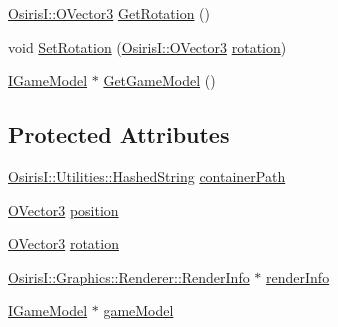 \begin{DoxyCompactItemize}
\item 
\hyperlink{struct_osiris_i_1_1_o_vector3}{Osiris\-I\-::\-O\-Vector3} \hyperlink{class_osiris_i_1_1_graphics_1_1_actors_1_1_i_actor_a3cf2d26df06c6a138e0305eff2e0f492}{Get\-Rotation} ()
\item 
void \hyperlink{class_osiris_i_1_1_graphics_1_1_actors_1_1_i_actor_af463112d067a438c342d2c9ae7500306}{Set\-Rotation} (\hyperlink{struct_osiris_i_1_1_o_vector3}{Osiris\-I\-::\-O\-Vector3} \hyperlink{class_osiris_i_1_1_graphics_1_1_actors_1_1_i_actor_aadbd536facb2686bdcb7d5c61c86dcd0}{rotation})
\item 
\hyperlink{class_osiris_i_1_1_graphics_1_1_actors_1_1_i_game_model}{I\-Game\-Model} $\ast$ \hyperlink{class_osiris_i_1_1_graphics_1_1_actors_1_1_i_actor_a474d10a3d3e71a93230510385b8cae01}{Get\-Game\-Model} ()
\end{DoxyCompactItemize}
\subsection*{Protected Attributes}
\begin{DoxyCompactItemize}
\item 
\hyperlink{class_osiris_i_1_1_utilities_1_1_hashed_string}{Osiris\-I\-::\-Utilities\-::\-Hashed\-String} \hyperlink{class_osiris_i_1_1_graphics_1_1_actors_1_1_i_actor_a71a1f44f10a60275425df720cfa84953}{container\-Path}
\item 
\hyperlink{struct_osiris_i_1_1_o_vector3}{O\-Vector3} \hyperlink{class_osiris_i_1_1_graphics_1_1_actors_1_1_i_actor_aee6ea81df284578ca63a186a03dd3bcc}{position}
\item 
\hyperlink{struct_osiris_i_1_1_o_vector3}{O\-Vector3} \hyperlink{class_osiris_i_1_1_graphics_1_1_actors_1_1_i_actor_aadbd536facb2686bdcb7d5c61c86dcd0}{rotation}
\item 
\hyperlink{struct_osiris_i_1_1_graphics_1_1_renderer_1_1_render_info}{Osiris\-I\-::\-Graphics\-::\-Renderer\-::\-Render\-Info} $\ast$ \hyperlink{class_osiris_i_1_1_graphics_1_1_actors_1_1_i_actor_a309233167da3c59ef681a8954c15bdf7}{render\-Info}
\item 
\hyperlink{class_osiris_i_1_1_graphics_1_1_actors_1_1_i_game_model}{I\-Game\-Model} $\ast$ \hyperlink{class_osiris_i_1_1_graphics_1_1_actors_1_1_i_actor_addc686085f0112060419e19342a08f25}{game\-Model}
\end{DoxyCompactItemize}


